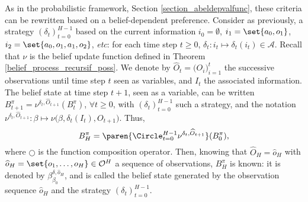 As in the probabilistic framework,
Section \ref{section_abeldepvalfunc},
these criteria can be rewritten 
based on a belief-dependent preference.
Consider as previously, a strategy $(\delta_t)_{t=0}^{H-1}$ 
based on the current information $i_0 = \emptyset$, $i_1 = \set{ a_0,o_1 }$, $i_2 = \set{ a_0,o_1,a_1,o_2 }$, \textit{etc}:
for each time step $t \geqslant 0$, $\delta_t: i_t \mapsto \delta_t(i_t) \in \mathcal{A}$.
Recall that $\nu$ is the belief update function defined in Theorem \ref{belief_process_recursif_poss}.
We denote by $\widehat{O}_t = \Big(O_i\Big)_{i=1}^{t}$ the successive observations until time step $t$ seen as variables, 
and $I_t$ the associated information. 
The belief state at time step $t+1$, seen as a variable, 
can be written $B_{t+1}^{\pi} = \nu^{\delta_{t},\widehat{O}_{t+1}}(B_{t}^{\pi})$, $\forall t\geqslant0$,
with $(\delta_t)_{t=0}^{H-1}$ such a strategy, and the notation $\nu^{\delta_{t},\widehat{O}_{t+1}}: \beta \mapsto \nu\Big( \beta, \delta_{t}(I_{t}), O_{t+1} \Big)$. Thus,
\[ B^{\pi}_{H} = \paren{ \Circle_{t=0}^{H-1} \nu^{\delta_t,\widehat{O}_{t+1}} }(B^{\pi}_0), \]
where $\Circle$ is the function composition operator.
Then, knowing that $\widehat{O}_H = \widehat{o}_H$ 
with $\widehat{o}_H = \set{o_1,\ldots,o_H} \in \mathcal{O}^H$ a sequence of observations, 
$B^{\pi}_{H}$ is known: it is denoted by $\beta^{\delta,\widehat{o}_H}_{\beta_0}$,
and is called the belief state generated by the observation sequence $\widehat{o}_H$ and the strategy $(\delta_t)_{t=0}^{H-1}$. 
